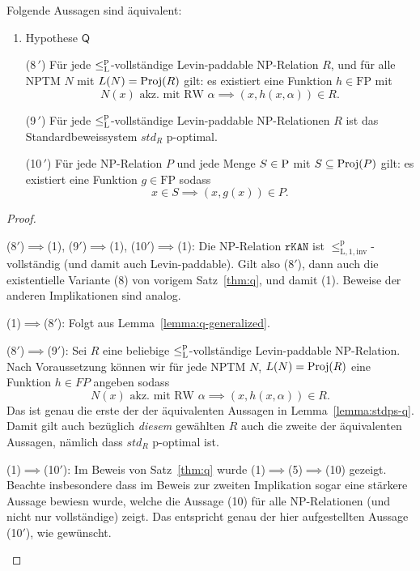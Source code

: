\begin{theorem}
    Folgende Aussagen sind äquivalent:
    \begin{enumerate}
        \item Hypothese $\mathsf{Q}$
        \item[(8\,$'\!$)] Für jede $\leqlp$-vollständige Levin-paddable NP-Relation $R$, und für alle NPTM $N$ mit $L(N)=\Proj(R)$ gilt: es existiert eine Funktion $h\in\mathrm{FP}$ mit
            \[ N(x) \text{ akz. mit RW $\alpha$} \implies (x,h(x,\alpha))\in R. \]
        \item[(9\,$'\!$)] Für jede $\leqlp$-vollständige Levin-paddable NP-Relationen $R$ ist das Standardbeweissystem $\mathit{std}_R$ p-optimal.
        \item[(10\,$'\!$)] Für jede NP-Relation $P$ und jede Menge $S\in \P$ mit $S\subseteq \Proj(P)$ gilt: es existiert eine Funktion $g\in\mathrm{FP}$ sodass
            \[ x\in S \implies (x, g(x))\in P. \]
    \end{enumerate}
\end{theorem}
\begin{proof}
\begin{prooflist}
\item (8$'$)$\implies$(1), (9$'$)$\implies$(1), (10$'$)$\implies$(1):
    Die NP-Relation $\mathtt{rKAN}$ ist $\leq_\mathrm{L,1,inv}^\mathrm p$-vollständig (und damit auch Levin-paddable).
    Gilt also (8$'$), dann auch die existentielle Variante (8) von vorigem Satz~\ref{thm:q}, und damit (1).
    Beweise der anderen Implikationen sind analog.

\item (1)$\implies$(8$'$): Folgt aus Lemma~\ref{lemma:q-generalized}.

\item (8$'$)$\implies$(9$'$): Sei $R$ eine beliebige $\leqlp$-vollständige Levin-paddable NP-Relation. Nach Voraussetzung können wir für jede NPTM $N$, $L(N)=\Proj(R)$ eine Funktion $h\in FP$ angeben sodass 
    \[ N(x) \text{ akz. mit RW $\alpha$} \implies (x,h(x,\alpha))\in R. \]
    Das ist genau die erste der der äquivalenten Aussagen in Lemma~\ref{lemma:stdps-q}. Damit gilt auch bezüglich \emph{diesem} gewählten $R$ auch die zweite der äquivalenten Aussagen, nämlich dass $\mathit{std}_R$ p-optimal ist.

\item (1)$\implies$(10$'$): Im Beweis von Satz~\ref{thm:q} wurde (1)$\implies$(5)$\implies$(10) gezeigt. Beachte insbesondere dass im Beweis zur zweiten Implikation sogar eine stärkere Aussage bewiesn wurde, welche die Aussage (10) für alle NP-Relationen (und nicht nur vollständige) zeigt. Das entspricht genau der hier aufgestellten Aussage (10$'$), wie gewünscht.
\end{prooflist}
\end{proof}

